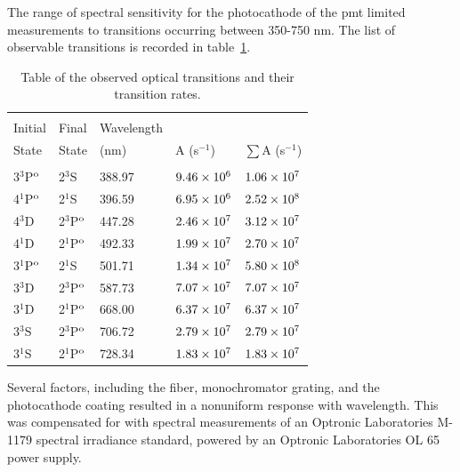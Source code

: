 The range of spectral sensitivity for the photocathode of the \acs{pmt} limited
measurements to transitions occurring between 350-750 nm. The list of observable
transitions is recorded in table~\ref{tbl:transitions}.
\begin{table}
  \centering
  \caption{Table of the observed optical transitions and their transition
    rates.}
  \begin{tabular}{lllll}
    \toprule                                                                    \\
    Initial      & Final        & Wavelength &              &                   \\
    State        & State        & (nm)       & A (s$^{-1}$) & $\sum$A (s$^{-1}$)\\
    \midrule                                                                    \\
    3$^3$P$^\mathrm{o}$ & 2$^3$S       & 388.97     & $9.46\times10^6$   & $1.06\times10^7$        \\
    4$^1$P$^\mathrm{o}$ & 2$^1$S       & 396.59     & $6.95\times10^6$   & $2.52\times10^8$        \\
    4$^3$D       & 2$^3$P$^\mathrm{o}$ & 447.28     & $2.46\times10^7$   & $3.12\times10^7$        \\
    4$^1$D       & 2$^1$P$^\mathrm{o}$ & 492.33     & $1.99\times10^7$   & $2.70\times10^7$        \\
    3$^1$P$^\mathrm{o}$ & 2$^1$S       & 501.71     & $1.34\times10^7$   & $5.80\times10^8$        \\
    3$^3$D       & 2$^3$P$^\mathrm{o}$ & 587.73     & $7.07\times10^7$   & $7.07\times10^7$        \\
    3$^1$D       & 2$^1$P$^\mathrm{o}$ & 668.00     & $6.37\times10^7$   & $6.37\times10^7$        \\
    3$^3$S       & 2$^3$P$^\mathrm{o}$ & 706.72     & $2.79\times10^7$   & $2.79\times10^7$        \\
    3$^1$S       & 2$^1$P$^\mathrm{o}$ & 728.34     & $1.83\times10^7$   & $1.83\times10^7$        \\
  \end{tabular}
  \label{tbl:transitions}
\end{table}
Several factors, including the fiber, monochromator grating, and the
photocathode coating resulted in a nonuniform response with wavelength. This was
compensated for with spectral measurements of an Optronic Laboratories M-1179
spectral irradiance standard, powered by an Optronic Laboratories OL 65 power
supply. 

